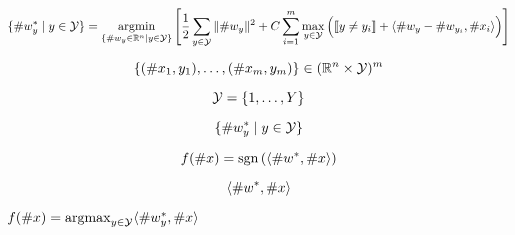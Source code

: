 \documentclass[11pt]{article}
\begin{document}
\pagestyle{empty}

\[
   \{\#w_y^* \mid y\in \SY\} = \argmin_{\{\#w_y\in\Re^n \mid y\in \SY\}} \Bigg [
   \frac{1}{2} \sum_{y\in \SY} \|\#w_y\|^2 + C \sum_{i=1}^m
   \max_{y\in \SY} \Big (\leftbb y \neq y_i\rightbb + \lz
   \#w_{y}-\#w_{y_i}, \#x_i\pz \Big ) \Bigg ]
\]

\[
  \{(\#x_1,y_1),\ldots,(\#x_m,y_m)\}\in (\mathbb{R}^n\times {\cal Y})^m
\]

\[
  {\cal Y}=\{1,\ldots,Y\}
\]

\[
  \{\#w_y^* \mid y\in {\cal Y}\}
\]

\[
  f(\#x) = \mathop{\rm sgn}\left( \langle \#w^*,\#x\rangle \right )
\]

\[
 \langle \#w^*,\#x\rangle
\]

$f(\#x) = \mathop{\rm argmax}_{y\in{\cal Y}} \langle \#w^*_y,\#x\rangle$
\end{document}
